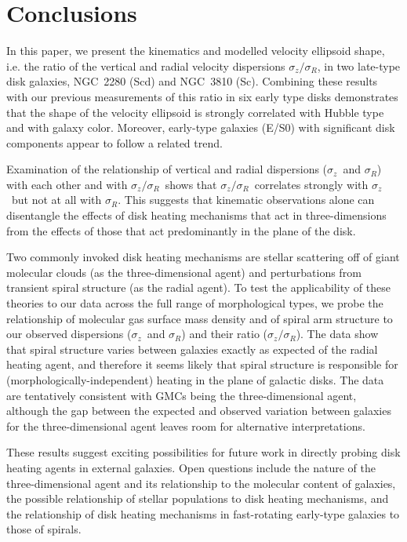 \documentclass[useAMS,usenatbib]{mn2e}
\newcommand{\sz}{$\sigma_z$}
\newcommand{\sr}{$\sigma_R$}
\newcommand{\szsr}{$\sigma_z/\sigma_R$}
\begin{document}
\section{Conclusions}
\label{sec:conclu}

In this paper, we present the kinematics and modelled velocity ellipsoid
shape, i.e. the ratio of the vertical and radial velocity dispersions
\szsr, in two late-type disk galaxies, NGC~2280 (Scd) and NGC~3810 (Sc).
Combining these results with our previous measurements of this ratio in
six early type disks demonstrates that the shape of the velocity
ellipsoid is strongly correlated with Hubble type and with galaxy color.
Moreover, early-type galaxies (E/S0) with significant disk components
appear to follow a related trend.

Examination of the relationship of vertical and radial dispersions
(\sz\ and \sr) with each other and with \szsr\ shows that
\szsr\ correlates strongly with \sz\ but not at all with \sr.  This
suggests that kinematic observations alone can disentangle the effects
of disk heating mechanisms that act in three-dimensions from the effects
of those that act predominantly in the plane of the disk.

Two commonly invoked disk heating mechanisms are stellar scattering off
of giant molecular clouds (as the three-dimensional agent) and
perturbations from transient spiral structure (as the radial agent).  To
test the applicability of these theories to our data across the full
range of morphological types, we probe the relationship of molecular gas
surface mass density and of spiral arm structure to our observed
dispersions (\sz\ and \sr) and their ratio (\szsr).  The data show that
spiral structure varies between galaxies exactly as expected of the
radial heating agent, and therefore it seems likely that spiral
structure is responsible for (morphologically-independent) heating in
the plane of galactic disks.  The data are tentatively consistent with
GMCs being the three-dimensional agent, although the gap between the
expected and observed variation between galaxies for the
three-dimensional agent leaves room for alternative interpretations.

These results suggest exciting possibilities for future work in directly
probing disk heating agents in external galaxies.  Open questions
include the nature of the three-dimensional agent and its relationship
to the molecular content of galaxies, the possible relationship of
stellar populations to disk heating mechanisms, and the relationship of
disk heating mechanisms in fast-rotating early-type galaxies to those of
spirals.
\end{document}
